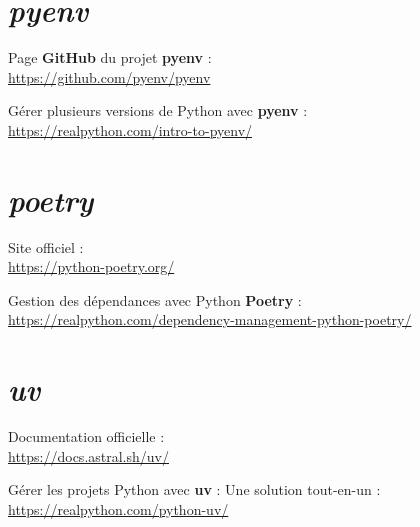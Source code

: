 \section*{\textit{pyenv}}
\begin{coloredenum}
\item Page \textbf{GitHub} du projet \textbf{pyenv} :\\ \url{https://github.com/pyenv/pyenv}
    \item Gérer plusieurs versions de Python avec \textbf{pyenv} :\\ \url{https://realpython.com/intro-to-pyenv/}
\end{coloredenum}

\section*{\textit{poetry}}
\begin{coloredenum}
    \item Site officiel :\\ \url{https://python-poetry.org/}
    \item Gestion des dépendances avec Python \textbf{Poetry} :\\ \url{https://realpython.com/dependency-management-python-poetry/}
\end{coloredenum}

\section*{\textit{uv}}
\begin{coloredenum}
    \item Documentation officielle :\\ \url{https://docs.astral.sh/uv/}
    \item Gérer les projets Python avec \textbf{uv} : Une solution tout-en-un :\\ \url{https://realpython.com/python-uv/}
\end{coloredenum}

